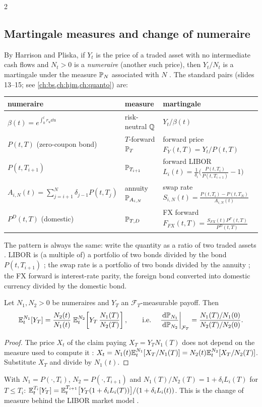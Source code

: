 \begin{paracol}{2}
\subsection{Martingale measures and change of numeraire}
By Harrison and Pliska, if $Y_t$ is the price of a traded asset with no intermediate cash flows and $N_t>0$ is a
\emph{numeraire} (another such price), then $Y_t/N_t$ is a martingale under the measure $\mathbb{P}_N$ associated with
$N$ . The standard pairs (slides 13--15; see \cref{ch:bs,ch:hjm,ch:quanto}) are:
\begin{center}\small
\begin{tabular}{@{}lll@{}}
\toprule
numeraire & measure & martingale\\
\midrule
$\beta(t)=e^{\int_0^tr_u\dd u}$ & risk-neutral $\mathbb{Q}$ & $Y_t/\beta(t)$\\
$P(t,T)$ (zero-coupon bond) & $T$-forward $\mathbb{P}_T$ & forward price $F_Y(t,T)=Y_t/P(t,T)$\\
$P(t,T_{i+1})$ & $\mathbb{P}_{T_{i+1}}$ & forward LIBOR $L_i(t)=\frac{1}{\delta_i}\bigl(\frac{P(t,T_i)}{P(t,T_{i+1})}-1\bigr)$\\
$A_{i,N}(t)=\sum_{j=i+1}^N\delta_{j-1}P(t,T_j)$ & annuity $\mathbb{P}_{A_{i,N}}$ & swap rate $S_{i,N}(t)=\frac{P(t,T_i)-P(t,T_N)}{A_{i,N}(t)}$\\
$P^D(t,T)$ (domestic) & $\mathbb{P}_{T,D}$ & FX forward $F_{FX}(t,T)=\frac{S_{FX}(t)P^F(t,T)}{P^D(t,T)}$\\
\bottomrule
\end{tabular}
\end{center}
The pattern is always the same: write the quantity as a ratio of two traded assets . LIBOR is (a
multiple of) a portfolio of two bonds divided by the bond $P(t,T_{i+1})$ ; the swap rate is a
portfolio of two bonds divided by the annuity ; the FX forward is interest-rate parity, the foreign
bond converted into domestic currency divided by the domestic bond.

\begin{proposition}\label{ch08:prop-numeraire}
Let $N_1,N_2>0$ be numeraires and $Y_T$ an $\mathcal F_T$-measurable payoff. Then
\[
  \mathbb{E}_t^{N_1}[Y_T]=\frac{N_2(t)}{N_1(t)}\;\mathbb{E}_t^{N_2}\!\left[Y_T\,\frac{N_1(T)}{N_2(T)}\right],\qquad
  \text{i.e.}\quad \left.\frac{\,\mathrm{d}\mathbb{P}_{N_1}}{\,\mathrm{d}\mathbb{P}_{N_2}}\right|_{\mathcal F_T}=\frac{N_1(T)/N_1(0)}{N_2(T)/N_2(0)} .
\]
\end{proposition}
\begin{proof}
The price $X_t$ of the claim paying $X_T=Y_TN_1(T)$ does not depend on the measure used to compute it
:
$X_t=N_1(t)\mathbb{E}_t^{N_1}[X_T/N_1(T)]=N_2(t)\mathbb{E}_t^{N_2}[X_T/N_2(T)]$. Substitute $X_T$ and divide by $N_1(t)$.
\end{proof}
With $N_1=P(\cdot,T_i)$, $N_2=P(\cdot,T_{i+1})$ and $N_1(T)/N_2(T)=1+\delta_iL_i(T)$ for $T\le T_i$:
$\mathbb{E}_t^{T_i}[Y_T]=\mathbb{E}_t^{T_{i+1}}\bigl[Y_T(1+\delta_iL_i(T))\bigr]/(1+\delta_iL_i(t))$. This is the change of measure
behind the LIBOR market model .


\end{paracol}
